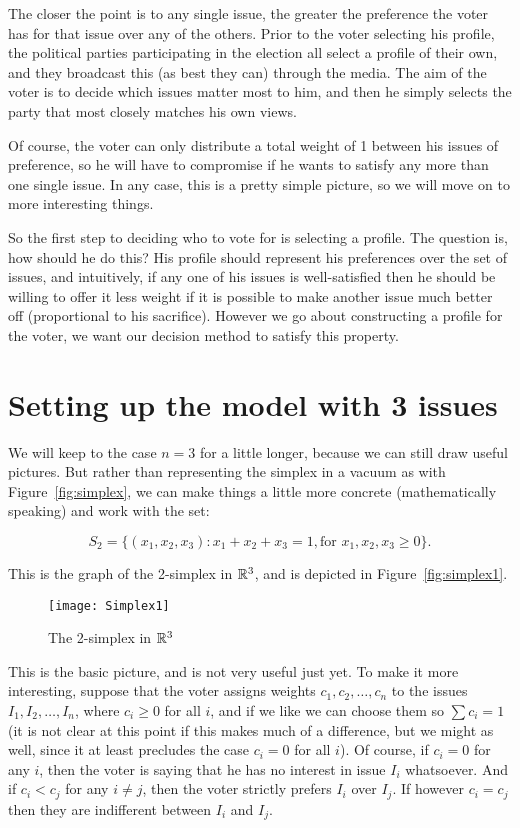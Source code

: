 \documentclass[
10pt, %
a4paper, %
oneside, %
headinclude,footinclude, %
BCOR5mm, %
]{scrartcl}
\theoremstyle{definition} %
\theoremstyle{plain} %
\theoremstyle{remark} %
\begin{document}
The closer the point is to any single issue, the greater the preference the voter has for that issue over any of the others. Prior to the voter selecting his profile, the political parties participating in the election all select a profile of their own, and they broadcast this (as best they can) through the media. The aim of the voter is to decide which issues matter most to him, and then he simply selects the party that most closely matches his own views.

Of course, the voter can only distribute a total weight of 1 between his issues of preference, so he will have to compromise if he wants to satisfy any more than one single issue. In any case, this is a pretty simple picture, so we will move on to more interesting things.

So the first step to deciding who to vote for is selecting a profile. The question is, how should he do this? His profile should represent his preferences over the set of issues, and intuitively, if any one of his issues is well-satisfied then he should be willing to offer it less weight if it is possible to make another issue much better off (proportional to his sacrifice). However we go about constructing a profile for the voter, we want our decision method to satisfy this property.

\section{Setting up the model with 3 issues}

We will keep to the case $n=3$ for a little longer, because we can still draw useful pictures. But rather than representing the simplex in a vacuum as with Figure~\vref{fig:simplex}, we can make things a little more concrete (mathematically speaking) and work with the set:

$$S_2 = \{(x_1,x_2,x_3) \colon x_1+x_2+x_3 = 1, \textrm{for } x_1,x_2,x_3 \geq 0\}.$$

This is the graph of the 2-simplex in $\R^3$, and is depicted in Figure~\vref{fig:simplex1}.

\begin{figure}[h]
\centering 
\texttt{[image: Simplex1]} 
\caption[The 2-simplex in $\R^3$]{The 2-simplex in $\R^3$} %
\label{fig:simplex1} 
\end{figure}

This is the basic picture, and is not very useful just yet. To make it more interesting, suppose that the voter assigns weights $c_1,c_2,\ldots,c_n$ to the issues $I_1,I_2,\ldots,I_n$, where $c_i\geq 0$ for all $i$, and if we like we can choose them so $\sum c_i = 1$ (it is not clear at this point if this makes much of a difference, but we might as well, since it at least precludes the case $c_i = 0$ for all $i$). Of course, if $c_i = 0$ for any $i$, then the voter is saying that he has no interest in issue $I_i$ whatsoever. And if $c_i < c_j$ for any $i\neq j$, then the voter strictly prefers $I_i$ over $I_j$. If however $c_i = c_j$ then they are indifferent between $I_i$ and $I_j$.
\end{document}
